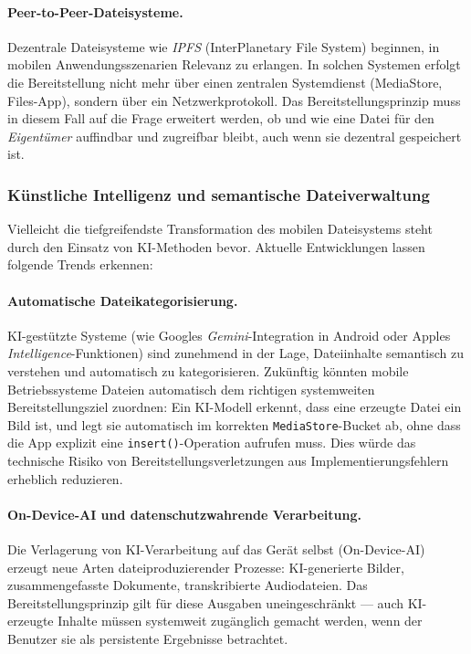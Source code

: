 ﻿\documentclass[12pt, a4paper]{article}
\begin{document}
\paragraph{Peer-to-Peer-Dateisysteme.}
Dezentrale Dateisysteme wie \emph{IPFS} (InterPlanetary File System) beginnen, in mobilen
Anwendungsszenarien Relevanz zu erlangen. In solchen Systemen erfolgt die Bereitstellung
nicht mehr über einen zentralen Systemdienst (MediaStore, Files-App), sondern über ein
Netzwerkprotokoll. Das Bereitstellungsprinzip muss in diesem Fall auf die Frage erweitert
werden, ob und wie eine Datei für den \emph{Eigentümer} auffindbar und zugreifbar bleibt,
auch wenn sie dezentral gespeichert ist.

\subsubsection{Künstliche Intelligenz und semantische Dateiverwaltung}

Vielleicht die tiefgreifendste Transformation des mobilen Dateisystems steht durch den
Einsatz von KI-Methoden bevor. Aktuelle Entwicklungen lassen folgende Trends erkennen:

\paragraph{Automatische Dateikategorisierung.}
KI-gestützte Systeme (wie Googles \emph{Gemini}-Integration in Android oder Apples
\emph{Intelligence}-Funktionen) sind zunehmend in der Lage, Dateiinhalte semantisch zu
verstehen und automatisch zu kategorisieren. Zukünftig könnten mobile Betriebssysteme
Dateien automatisch dem richtigen systemweiten Bereitstellungsziel zuordnen: Ein
KI-Modell erkennt, dass eine erzeugte Datei ein Bild ist, und legt sie automatisch im
korrekten \texttt{MediaStore}-Bucket ab, ohne dass die App explizit eine \texttt{insert()}-Operation
aufrufen muss. Dies würde das technische Risiko von Bereitstellungsverletzungen aus
Implementierungsfehlern erheblich reduzieren.

\paragraph{On-Device-AI und datenschutzwahrende Verarbeitung.}
Die Verlagerung von KI-Verarbeitung auf das Gerät selbst (On-Device-AI) erzeugt neue
Arten dateiproduzierender Prozesse: KI-generierte Bilder, zusammengefasste Dokumente,
transkribierte Audiodateien. Das Bereitstellungsprinzip gilt für diese Ausgaben
uneingeschränkt --- auch KI-erzeugte Inhalte müssen systemweit zugänglich gemacht werden,
wenn der Benutzer sie als persistente Ergebnisse betrachtet.
\end{document}
